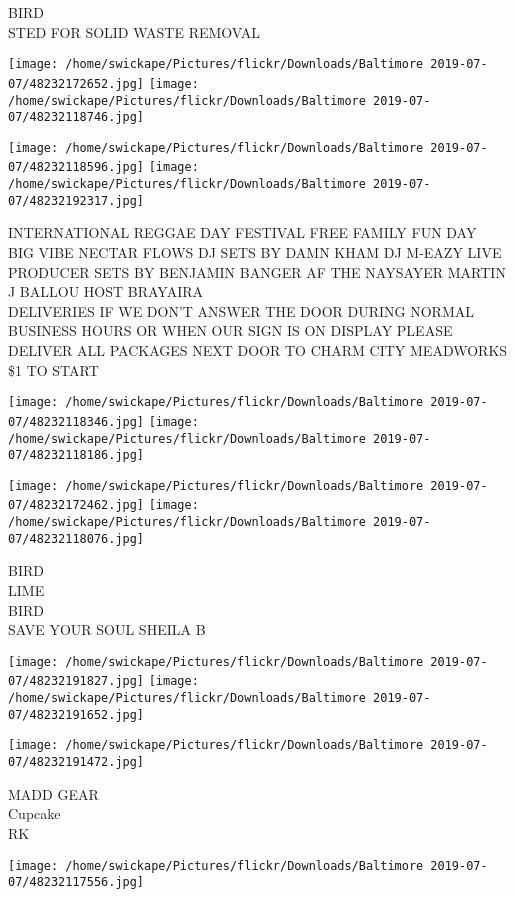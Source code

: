 \documentclass[10pt,letterpaper]{article}
\begin{document}
BIRD\\
STED FOR SOLID WASTE REMOVAL
\pagebreak

\texttt{[image: /home/swickape/Pictures/flickr/Downloads/Baltimore 2019-07-07/48232172652.jpg]}
\texttt{[image: /home/swickape/Pictures/flickr/Downloads/Baltimore 2019-07-07/48232118746.jpg]}

\texttt{[image: /home/swickape/Pictures/flickr/Downloads/Baltimore 2019-07-07/48232118596.jpg]}
\texttt{[image: /home/swickape/Pictures/flickr/Downloads/Baltimore 2019-07-07/48232192317.jpg]}

INTERNATIONAL REGGAE DAY FESTIVAL FREE FAMILY FUN DAY\\
BIG VIBE NECTAR FLOWS DJ SETS BY DAMN KHAM DJ M{-}EAZY LIVE PRODUCER SETS BY BENJAMIN BANGER AF THE NAYSAYER MARTIN J BALLOU HOST BRAYAIRA\\
DELIVERIES IF WE DON'T ANSWER THE DOOR DURING NORMAL BUSINESS HOURS OR WHEN OUR SIGN IS ON DISPLAY PLEASE DELIVER ALL PACKAGES NEXT DOOR TO CHARM CITY MEADWORKS\\
\$1 TO START
\pagebreak

\texttt{[image: /home/swickape/Pictures/flickr/Downloads/Baltimore 2019-07-07/48232118346.jpg]}
\texttt{[image: /home/swickape/Pictures/flickr/Downloads/Baltimore 2019-07-07/48232118186.jpg]}

\texttt{[image: /home/swickape/Pictures/flickr/Downloads/Baltimore 2019-07-07/48232172462.jpg]}
\texttt{[image: /home/swickape/Pictures/flickr/Downloads/Baltimore 2019-07-07/48232118076.jpg]}

BIRD\\
LIME\\
BIRD\\
SAVE YOUR SOUL SHEILA B
\pagebreak

\texttt{[image: /home/swickape/Pictures/flickr/Downloads/Baltimore 2019-07-07/48232191827.jpg]}
\texttt{[image: /home/swickape/Pictures/flickr/Downloads/Baltimore 2019-07-07/48232191652.jpg]}

\texttt{[image: /home/swickape/Pictures/flickr/Downloads/Baltimore 2019-07-07/48232191472.jpg]}

MADD GEAR\\
Cupcake\\
RK
\pagebreak

\texttt{[image: /home/swickape/Pictures/flickr/Downloads/Baltimore 2019-07-07/48232117556.jpg]}
\end{document}
